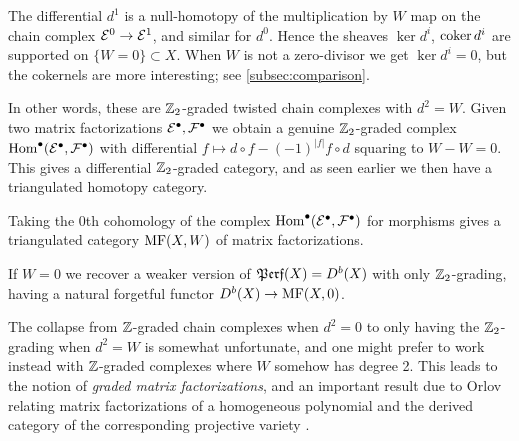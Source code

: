 \begin{remark}{}{}
    The differential $d^1$ is a null-homotopy of the multiplication by $W$ map
    on the chain complex $\mathcal{E}^0\to\mathcal{E}^1$, and similar for $d^0$. Hence the
    sheaves $\ker d^i$, $\operatorname{coker} d^i$ are supported on $\{W=0\}\subset X$. When
    $W$ is not a zero-divisor we get $\ker d^i=0$, but the cokernels are more
    interesting; see \ref{subsec:comparison}.
\end{remark}

In other words, these are $\mathbb{Z}_2$-graded twisted chain complexes with $d^2=W$.
Given two matrix factorizations $\mathcal{E}^\bullet,\mathcal{F}^\bullet$ we obtain a
genuine $\mathbb{Z}_2$-graded complex $\operatorname{Hom}^\bullet(\mathcal{E}^\bullet,\mathcal{F}^\bullet)$ with
differential $f\mapsto d\circ f-(-1)^{|f|}f\circ d$ squaring to $W-W=0$. This
gives a differential $\mathbb{Z}_2$-graded category, and as seen earlier we then have a
triangulated homotopy category.

\begin{definition}{}{}
    Taking the 0th cohomology of the complex
    $\operatorname{Hom}^\bullet(\mathcal{E}^\bullet,\mathcal{F}^\bullet)$ for morphisms gives a
    triangulated category $\operatorname{MF}(X,W)$ of matrix factorizations.
\end{definition}

\begin{remark}{}{}
    If $W=0$ we recover a weaker version of $\operatorname{\mathfrak{Perf}}(X)=D^b(X)$ with only
    $\mathbb{Z}_2$-grading, having a natural forgetful functor $D^b(X)\to\operatorname{MF}(X,0)$.
\end{remark}

The collapse from $\mathbb{Z}$-graded chain complexes when $d^2=0$ to only having the
$\mathbb{Z}_2$-grading when $d^2=W$ is somewhat unfortunate, and one might prefer to
work instead with $\mathbb{Z}$-graded complexes where $W$ somehow has degree 2. This
leads to the notion of \emph{graded matrix factorizations}, and an important
result due to Orlov relating matrix factorizations of a homogeneous polynomial
and the derived category of the corresponding projective variety
\cite{OrlovTheorem}.

